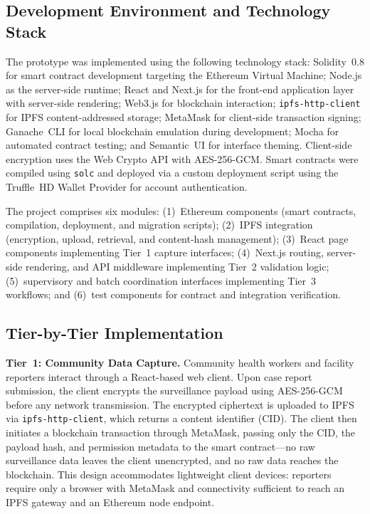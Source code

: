 \subsection{Development Environment and Technology Stack}\label{subsec:devenv}

The prototype was implemented using the following technology stack: Solidity~0.8 for smart contract development targeting the Ethereum Virtual Machine; Node.js as the server-side runtime; React and Next.js for the front-end application layer with server-side rendering; Web3.js for blockchain interaction; \texttt{ipfs-http-client} for IPFS content-addressed storage; MetaMask for client-side transaction signing; Ganache~CLI for local blockchain emulation during development; Mocha for automated contract testing; and Semantic~UI for interface theming. Client-side encryption uses the Web Crypto API with AES-256-GCM. Smart contracts were compiled using \texttt{solc} and deployed via a custom deployment script using the Truffle~HD Wallet Provider for account authentication.

The project comprises six modules: (1)~Ethereum components (smart contracts, compilation, deployment, and migration scripts); (2)~IPFS integration (encryption, upload, retrieval, and content-hash management); (3)~React page components implementing Tier~1 capture interfaces; (4)~Next.js routing, server-side rendering, and API middleware implementing Tier~2 validation logic; (5)~supervisory and batch coordination interfaces implementing Tier~3 workflows; and (6)~test components for contract and integration verification.

\subsection{Tier-by-Tier Implementation}\label{subsec:tiers}

\textbf{Tier~1: Community Data Capture.} Community health workers and facility reporters interact through a React-based web client. Upon case report submission, the client encrypts the surveillance payload using AES-256-GCM before any network transmission. The encrypted ciphertext is uploaded to IPFS via \texttt{ipfs-http-client}, which returns a content identifier (CID). The client then initiates a blockchain transaction through MetaMask, passing only the CID, the payload hash, and permission metadata to the smart contract---no raw surveillance data leaves the client unencrypted, and no raw data reaches the blockchain. This design accommodates lightweight client devices: reporters require only a browser with MetaMask and connectivity sufficient to reach an IPFS gateway and an Ethereum node endpoint.

